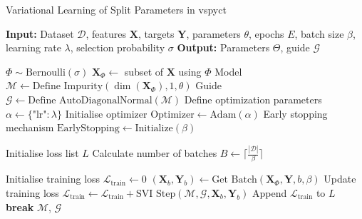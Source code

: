 \documentclass[3p,review,authoryear]{elsarticle}
\begin{document}
\begin{algorithm}[h!]
\caption{Variational Learning of Split Parameters in \gls{vspyct}}
\label{alg:learn_split}
\begin{algorithmic}[1]

\State \textbf{Input:} Dataset $\mathcal{D}$, features $\mathbf{X}$, targets $\mathbf{Y}$, parameters $\theta$, epochs $E$, batch size $\beta$, learning rate $\lambda$, selection probability $\sigma$
\State \textbf{Output:} Parameters $\Theta$, guide $\mathcal{G}$

    \State $\Phi \sim \text{Bernoulli}(\sigma)$ 
    \State $\mathbf{X}_\Phi \leftarrow$ subset of $\mathbf{X}$ using $\Phi$
    \State Model $\mathcal{M} \leftarrow \text{Define Impurity}(\dim(\mathbf{X}_\Phi), 1, \theta)$
    \State Guide $\mathcal{G} \leftarrow \text{Define AutoDiagonalNormal}(\mathcal{M})$
    \State Define optimization parameters $\alpha \leftarrow \{\text{"lr"}: \lambda\}$
    \State Initialise optimizer $\text{Optimizer} \leftarrow \text{Adam}(\alpha)$
    \State Early stopping mechanism $\text{EarlyStopping} \leftarrow \text{Initialize}(\beta)$
    
    \State Initialise loss list $L$
    \State Calculate number of batches $B \leftarrow \lceil \frac{|\mathcal{D}|}{\beta} \rceil$
    
        \State Initialise training loss $\mathcal{L}_{\text{train}} \leftarrow 0$
            \State $(\mathbf{X}_b, \mathbf{Y}_b) \leftarrow \text{Get Batch}(\mathbf{X}_\Phi, \mathbf{Y}, b, \beta)$
            \State Update training loss $\mathcal{L}_{\text{train}} \leftarrow \mathcal{L}_{\text{train}} + \text{SVI Step}(\mathcal{M}, \mathcal{G}, \mathbf{X}_b, \mathbf{Y}_b)$
        \EndFor
        \State Append $\mathcal{L}_{\text{train}}$ to $L$
            \State \textbf{break}
        \EndIf
    \EndFor
    \State \Return $\mathcal{M}$, $\mathcal{G}$
\EndProcedure

\end{algorithmic}
\end{algorithm}
\end{document}
